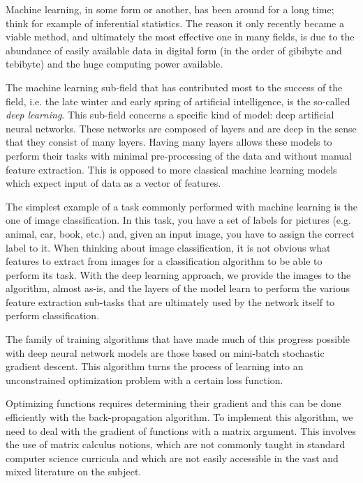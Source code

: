 \documentclass[pdflatex,sn-mathphys-num]{sn-jnl}%
\theoremstyle{thmstyleone}%
\theoremstyle{thmstyletwo}%
\theoremstyle{thmstylethree}%
\begin{document}
Machine learning, in some form or another, has been around for a long time; think for example of inferential statistics. The reason it only recently became a viable
method, and ultimately the most effective one in many fields, is due to the
abundance of easily available data in digital form (in the order of gibibyte and
tebibyte) and the huge computing power available.

The machine learning sub-field that has contributed most to the success of the field, i.e. the late winter and early spring of artificial intelligence, is the so-called \emph{deep
learning}.  This sub-field concerns a specific kind of model: deep artificial
neural networks. These networks are composed of layers and are deep in the sense
that they consist of many layers. Having many layers allows these models to perform
their tasks with minimal pre-processing of the data and without manual feature
extraction. This is opposed to more classical machine learning models which expect input of data as a vector of features.

\iftrue
The simplest example of a task commonly performed with machine learning is the one of image classification. In this task, you have a set of labels for pictures (e.g. animal, car, book, etc.) and, given an input image, you have to assign the correct label to it.  
When thinking about image classification, it is not obvious what features to extract from images for a classification algorithm to be able to perform its task. With the deep learning approach, we provide the images to the algorithm, almost as-is, and the layers of the model learn to perform the various feature extraction sub-tasks that are ultimately used by the network itself to perform classification.
\fi

The family of training algorithms that have made much of this progress possible with deep neural network models are those based on mini-batch stochastic gradient descent. This algorithm turns the process of learning into an unconstrained optimization problem with a certain loss function.

Optimizing functions requires determining their gradient and this can be done efficiently with the back-propagation algorithm.
To implement this algorithm, we need to deal with the gradient of functions with a matrix argument.
This involves the use of matrix calculus notions, which are not commonly taught in standard computer science curricula and which are not easily accessible in the vast and mixed literature on the subject.
\end{document}
